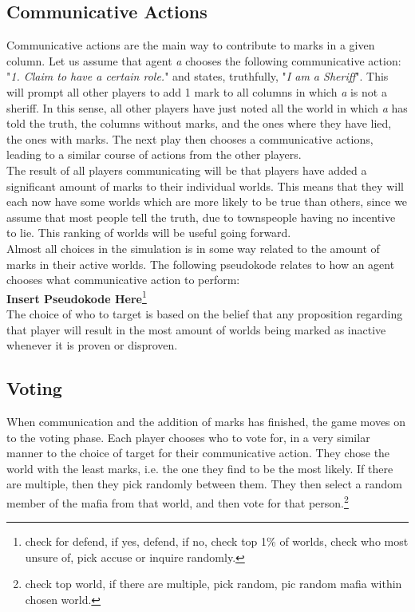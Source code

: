\subsection{Communicative Actions}\label{CommunicativeActions}
Communicative actions are the main way to contribute to marks in a given 
column. Let us assume that agent \textit{a} chooses the following communicative 
action: "\textit{1. Claim to have a certain role.}" and states, truthfully, 
"\textit{I am a Sheriff}". This will prompt all other players to add 1 mark to 
all columns in which \textit{a} is not a sheriff. In this sense, all other 
players have just noted all the world in which \textit{a} has told the truth, 
the columns without marks, and the ones where they have lied, the ones with 
marks. The next play then chooses a communicative actions, leading to a similar 
course of actions from the other players. \\
The result of all players communicating will be that players 
have added a significant amount of marks to their individual worlds. This 
means that they will each now have some worlds which are more likely to be true 
than others, since we assume that most people tell the truth, due to 
townspeople having no incentive to lie. This ranking of worlds will be useful 
going forward.\\
Almost all choices in the simulation is in some way related to the amount of 
marks in their active worlds. The following pseudokode relates to how an agent 
chooses what communicative action to perform: \\
\textbf{\*Insert Pseudokode Here\*}\footnote[1]{check for defend, if yes, 
defend, if no, check top 1\% of worlds, check who most unsure of, pick accuse 
or inquire randomly.}\\
The choice of who to target is based on the belief that any proposition 
regarding that player will result in the most amount of worlds being marked as 
inactive whenever it is proven or disproven.
\subsection{Voting}\label{Voting}
When communication and the addition of marks has finished, the game moves on to 
the voting phase. Each player chooses who to vote for, in a very similar manner 
to the choice of target for their communicative action. They chose the world 
with the least marks, i.e. the one they find to be the most likely. If there 
are multiple, then they pick randomly between them. They then select a random 
member of the mafia from that world, and then vote for that person.\footnote[2]{
check top world, if there are multiple, pick random, pic random mafia within 
chosen world.} 
